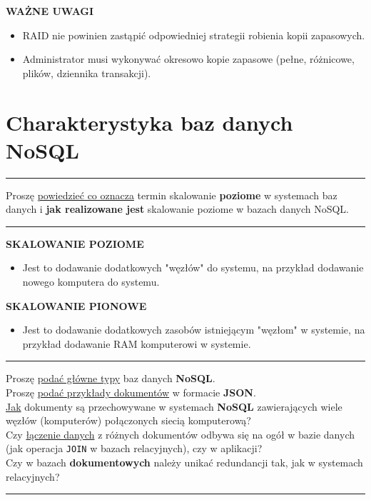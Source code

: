 \documentclass[a5paper,6pt]{article}
\newcommand{\horrule}[1]{\rule{\linewidth}{#1}}
\begin{document}
    \textbf{WAŻNE UWAGI}
    \begin{itemize}
        \item RAID nie powinien zastąpić odpowiedniej strategii robienia kopii
              zapasowych.
        \item Administrator musi wykonywać okresowo kopie zapasowe (pełne,
              różnicowe, plików, dziennika transakcji).
    \end{itemize}


\pagebreak

    \section{Charakterystyka baz danych NoSQL} %
    \label{sec:charakterystyka_baz_danych_nosql}

    \horrule{0.5pt}
    Proszę \underline{powiedzieć co oznacza} termin skalowanie \textbf{poziome}
    w systemach baz danych i \textbf{jak realizowane jest} skalowanie poziome
    w bazach danych NoSQL.\\
    \horrule{0.5pt}

    \vskip 0.5cm

    \textbf{SKALOWANIE POZIOME}
    \begin{itemize}
        \item Jest to dodawanie dodatkowych "węzłów" do systemu, na przykład
              dodawanie nowego komputera do systemu.
    \end{itemize}

    \textbf{SKALOWANIE PIONOWE}
    \begin{itemize}
        \item Jest to dodawanie dodatkowych zasobów istniejącym "węzłom" w
        systemie, na przykład dodawanie RAM komputerowi w systemie.
    \end{itemize}

    \horrule{0.5pt}
    Proszę \underline{podać główne typy} baz danych \textbf{NoSQL}.\\
    Proszę \underline{podać przykłady dokumentów} w formacie \textbf{JSON}.\\
    \underline{Jak} dokumenty są przechowywane w systemach \textbf{NoSQL}
    zawierających wiele węzłów (komputerów) połączonych siecią komputerową?\\
    Czy \underline{łączenie danych} z różnych dokumentów odbywa się na ogół w
    bazie danych
    (jak operacja \texttt{JOIN} w bazach relacyjnych), czy w aplikacji?\\
    Czy w bazach \textbf{dokumentowych} należy unikać redundancji tak, jak w
    systemach relacyjnych?\\
    \horrule{0.5pt}
\end{document}
